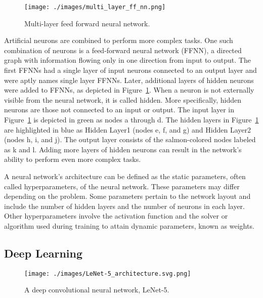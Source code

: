 \begin{figure}[h]
    \centering
    \texttt{[image: ./images/multi\_layer\_ff\_nn.png]}
    \caption{Multi-layer feed forward neural network.}
    \label{fig:multi_ffnn}
\end{figure}

Artificial neurons are combined to perform more complex tasks. One such
combination of neurons is a feed-forward neural network (FFNN), a directed graph
with information flowing only in one direction from input to output. The first
FFNNs had a single layer of input neurons connected to an output layer and were
aptly names single layer FFNNs.
Later, additional layers of hidden neurons were added to FFNNs, as depicted in
Figure~\ref{fig:multi_ffnn}.  When a neuron is not externally visible from the
neural network, it is called hidden. More specifically, hidden neurons are those
not connected to an input or output. The input layer in
Figure~\ref{fig:multi_ffnn} is depicted in green as nodes a through d. The
hidden layers in Figure~\ref{fig:multi_ffnn} are highlighted in blue as Hidden
Layer1 (nodes e, f, and g) and Hidden Layer2 (nodes h, i, and j). The output
layer consists of the salmon-colored nodes labeled as k and l. Adding more
layers of hidden neurons can result in the network's ability to perform even
more complex tasks.

A neural network's architecture can be defined as the static parameters, often
called hyperparameters, of the neural network.  These parameters may differ
depending on the problem. Some parameters pertain to the network layout and
include the number of hidden layers and the number of neurons in each layer.  Other
hyperparameters involve the activation function and the solver or algorithm used
during training to attain dynamic parameters, known as weights.

\subsection{Deep Learning}

\begin{figure}[h]
    \centering
    \texttt{[image: ./images/LeNet-5\_architecture.svg.png]}
    \caption{A deep convolutional neural network, LeNet-5\cite{zhang2023dive}.}
    \label{fig:lenet5}
\end{figure}

